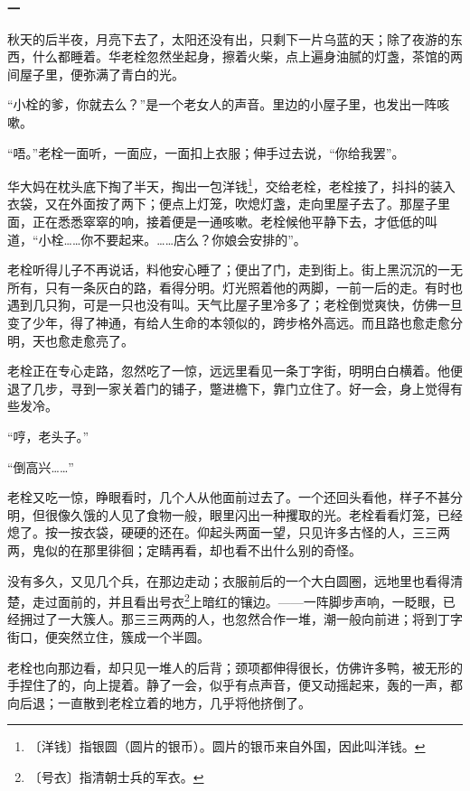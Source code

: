\documentclass[12pt,UTF-8,openany]{ctexbook}
\begin{document}
\begin{normalsize}
    
    \begin{center}\textbf{一}\end{center}
    
    秋天的后半夜，月亮下去了，太阳还没有出，只剩下一片乌蓝的天；除了夜游的东西，什么都睡着。华老栓忽然坐起身，擦着火柴，点上遍身油腻的灯盏，茶馆的两间屋子里，便弥满了青白的光。
    
    “小栓的爹，你就去么？”是一个老女人的声音。里边的小屋子里，也发出一阵咳嗽。
    
    “唔。”老栓一面听，一面应，一面扣上衣服；伸手过去说，“你给我罢”。
    
    华大妈在枕头底下掏了半天，掏出一包洋钱\footnote{〔洋钱〕指银圆（圆片的银币）。圆片的银币来自外国，因此叫洋钱。}，交给老栓，老栓接了，抖抖的装入衣袋，又在外面按了两下；便点上灯笼，吹熄灯盏，走向里屋子去了。那屋子里面，正在悉悉窣窣的响，接着便是一通咳嗽。老栓候他平静下去，才低低的叫道，“小栓……你不要起来。……店么？你娘会安排的”。
    
    老栓听得儿子不再说话，料他安心睡了；便出了门，走到街上。街上黑沉沉的一无所有，只有一条灰白的路，看得分明。灯光照着他的两脚，一前一后的走。有时也遇到几只狗，可是一只也没有叫。天气比屋子里冷多了；老栓倒觉爽快，仿佛一旦变了少年，得了神通，有给人生命的本领似的，跨步格外高远。而且路也愈走愈分明，天也愈走愈亮了。
    
    老栓正在专心走路，忽然吃了一惊，远远里看见一条丁字街，明明白白横着。他便退了几步，寻到一家关着门的铺子，蹩进檐下，靠门立住了。好一会，身上觉得有些发冷。
    
    “哼，老头子。”
    
    “倒高兴……”
    
    老栓又吃一惊，睁眼看时，几个人从他面前过去了。一个还回头看他，样子不甚分明，但很像久饿的人见了食物一般，眼里闪出一种攫取的光。老栓看看灯笼，已经熄了。按一按衣袋，硬硬的还在。仰起头两面一望，只见许多古怪的人，三三两两，鬼似的在那里徘徊；定睛再看，却也看不出什么别的奇怪。
    
    没有多久，又见几个兵，在那边走动；衣服前后的一个大白圆圈，远地里也看得清楚，走过面前的，并且看出号衣\footnote{〔号衣〕指清朝士兵的军衣。}上暗红的镶边。——一阵脚步声响，一眨眼，已经拥过了一大簇人。那三三两两的人，也忽然合作一堆，潮一般向前进；将到丁字街口，便突然立住，簇成一个半圆。
    
    老栓也向那边看，却只见一堆人的后背；颈项都伸得很长，仿佛许多鸭，被无形的手捏住了的，向上提着。静了一会，似乎有点声音，便又动摇起来，轰的一声，都向后退；一直散到老栓立着的地方，几乎将他挤倒了。
    

\end{normalsize}
\end{document}
